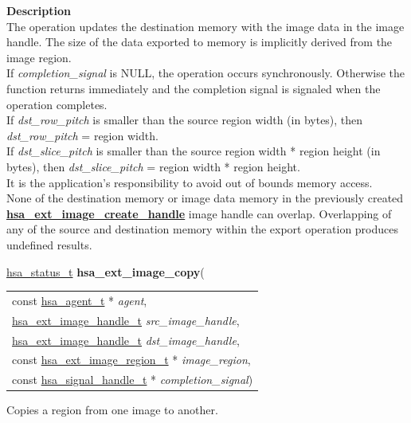 \documentclass[final]{book}
\newcommand{\hsaarg}[1]{\textit{#1}}
\newcommand{\reffun}[1]{\textbf{#1}}
\begin{document}
\vspace{-4mm}\noindent\textbf{Description}\\[1mm]
The operation updates the destination memory with the image data in the image handle. The size of the data exported to memory is implicitly derived from the image region.\\[2mm]
If \textit{completion_signal} is NULL, the operation occurs synchronously. Otherwise the function returns immediately and the completion signal is signaled when the operation completes.\\[2mm]
If \textit{dst_row_pitch} is smaller than the source region width (in bytes), then \textit{dst_row_pitch} = region width.\\[2mm]
If \textit{dst_slice_pitch} is smaller than the source region width * region height (in bytes), then \textit{dst_slice_pitch} = region width * region height.\\[2mm]
It is the application's responsibility to avoid out of bounds memory access.\\[2mm]
None of the destination memory or image data memory in the previously created \hyperlink{group__images_1gaab643889d22ca4ea75ab16968c15c877}{\reffun{hsa_ext_image_create_handle}} image handle can overlap. Overlapping of any of the source and destination memory within the export operation produces undefined results. 


\noindent\begin{tcolorbox}[breakable,nobeforeafter,colframe=white,colback=lightgray,left=0mm]
\hyperlink{group__status_1gad755322e7ff95456520e8abdbe90d225}{hsa_status_t} \hypertarget{group__images_1gac39df8ad106694198a7c1cae2c17f612}{\textbf{hsa_ext_image_copy}}(
\vspace{-3.5mm}\begin{longtable}{@{}p{\textwidth}}
\hspace{1.7em}const \hyperlink{group__topology_1gab8db3fb886332a24acac08ec361e1d86}{hsa_agent_t} * \hsaarg{agent},\\
\hspace{1.7em}\hyperlink{group__images_1gae59456dc07140b58a2d526bcf01d2d88}{hsa_ext_image_handle_t} \hsaarg{src_image_handle},\\
\hspace{1.7em}\hyperlink{group__images_1gae59456dc07140b58a2d526bcf01d2d88}{hsa_ext_image_handle_t} \hsaarg{dst_image_handle},\\
\hspace{1.7em}const \hyperlink{group__images_1gada3adaf96ca2ddac605280cae6470b73}{hsa_ext_image_region_t} * \hsaarg{image_region},\\
\hspace{1.7em}const \hyperlink{group__signals_1ga6592c136d70853d855bc11d9efdbf534}{hsa_signal_handle_t} * \hsaarg{completion_signal})\end{longtable}

\end{tcolorbox}
Copies a region from one image to another.
\end{document}
